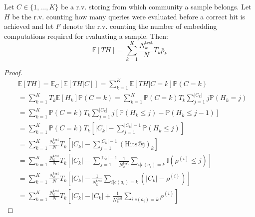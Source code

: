 \begin{lemma}
    \label{lemma:expected_evaluations}
    Let $C \in \{1,\dots,K\}$ be a r.v. storing from which community a sample belongs. Let $H$ be the r.v. counting how many queries were evaluated before a correct hit is achieved and let $F$ denote the r.v. counting the number of embedding computations required for evaluating a sample. Then:
    $$\mathbb{E}[T H] = \sum_{k=1}^{K}{\frac{N_k^{\text{test}}}{N} T_k \bar{\rho}_k}$$
\end{lemma}
\begin{proof}
    \begin{align*}
        &\mathbb{E}[T H] = \mathbb{E}_{C}[\mathbb{E}[T H | C]]%
        = \sum_{k=1}^{K}{\mathbb{E}[T H | C=k] \mathbb{P}(C=k)}%
        \\
        &= \sum_{k=1}^{K}{T_k \mathbb{E}[H_k] \mathbb{P}(C=k)}%
        = \sum_{k=1}^{K}{\mathbb{P}(C=k) T_k \sum_{j=1}^{|C_k|}{j \mathbb{P}(H_k=j)}}%
        \\
        &= \sum_{k=1}^{K}{\mathbb{P}(C=k) T_k \sum_{j=1}^{|C_k|}{j [\mathbb{P}(H_k \leq j) - \mathbb{P}(H_k \leq j-1)]}}%
        \\
        &= \sum_{k=1}^{K}{\mathbb{P}(C=k) T_k \left[|C_k|- \sum_{j=1}^{|C_k|-1}{\mathbb{P}(H_k \leq j)}\right]}%
        \\
        &= \sum_{k=1}^{K}{\frac{N_k^{\text{test}}}{N} T_k \left[|C_k|- \sum_{j=1}^{|C_k|-1}{(\text{Hits@j})_k}\right]}%
        \\
        &= \sum_{k=1}^{K}{\frac{N_k^{\text{test}}}{N} T_k \left[|C_k|- \sum_{j=1}^{|C_k|-1}{\frac{1}{N_k^{\text{test}}}\sum_{i | c(a_i)=k}{\mathbb{I}(\rho^{(i)} \leq j)}}\right]}%
        \\
        &= \sum_{k=1}^{K}{\frac{N_k^{\text{test}}}{N} T_k \left[|C_k|- \frac{1}{N_k^{\text{test}}}\sum_{i | c(a_i)=k}{(|C_k|- \rho^{(i)})}\right]}%
        \\
        &= \sum_{k=1}^{K}{\frac{N_k^{\text{test}}}{N} T_k \left[|C_k|- |C_k| + \frac{1}{N_k^{\text{test}}}\sum_{i | c(a_i)=k}{\rho^{(i)}}\right]}%

\end{align*}
\end{proof}
